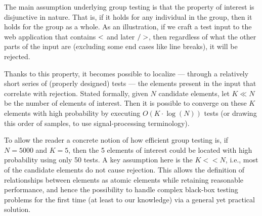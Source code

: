 The main assumption underlying group testing is that the property of interest is disjunctive in nature. That is, if it holds for any individual in the group, then it holds for the group as a whole. As an illustration, if we craft a test input to the web application that contains ${\sf <}$ and later ${\sf />}$, then regardless of what the other parts of the input are (excluding some end cases like line breaks), it will be rejected.

Thanks to this property, it becomes possible to localize --- through a relatively short series of (properly designed) tests --- the elements present in the input that correlate with rejection. Stated formally, given $N$ candidate elements, let $K \ll N$ be the number of elements of interest. Then it is possible to converge on these $K$ elements with high probability by executing $O(K \cdot \log (N))$ tests (or drawing this order of samples, to use signal-processing terminology).

To allow the reader a concrete notion of how efficient group testing is, if $N=5000$ and $K=5$, then the 5 elements of interest could be located with high probability using only 50 tests. A key assumption here is the $K<<N$, i.e., most of the candidate elements do not cause rejection. This allows the definition of relationships between elements as atomic elements while retaining reasonable performance, and hence the possibility to handle complex black-box testing problems for the first time (at least to our knowledge) via a general yet practical solution.